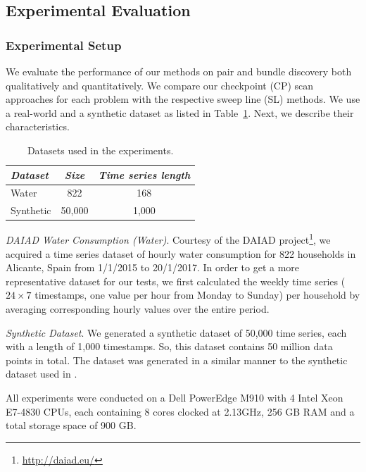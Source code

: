 \subsection{Experimental Evaluation}
\label{sec:eval}

\subsubsection{Experimental Setup}
\label{subsec:evaluation_setup}
We evaluate the performance of our methods on pair and bundle discovery both qualitatively and quantitatively. We compare our checkpoint (CP) scan approaches for each problem with the respective sweep line (SL) methods. We use a real-world and a synthetic dataset as listed in Table~\ref{tab:datasets}. Next, we describe their characteristics.

\begin{table}[t]
\centering
\caption{Datasets used in the experiments.}
 \vspace{-10pt}
\begin{small}
\begin{tabular}{lcc} 
\hline
{\em Dataset} & {\em Size} & {\em Time series length} \\
\hline
Water & 822 & 168  \\
Synthetic & 50,000 & 1,000 \\
\hline
\end{tabular}
\end{small}
\label{tab:datasets}
\end{table}

\emph{DAIAD Water Consumption (Water)}. Courtesy of the DAIAD project\footnote{ \url{http://daiad.eu/}}, we acquired a time series dataset of hourly water consumption for 822 households in Alicante, Spain from 1/1/2015 to 20/1/2017. In order to get a more representative dataset for our tests, we first calculated the weekly time series ($24 \times 7$ timestamps, one value per hour from Monday to Sunday) per household by averaging corresponding hourly values over the entire period.

\emph{Synthetic Dataset}. We generated a synthetic dataset of 50,000 time series, each with a length of 1,000 timestamps. So, this dataset contains 50 million data points in total. The dataset was generated in a similar manner to the synthetic dataset used in \cite{keogh1999indexing}.

All experiments were conducted on a Dell PowerEdge M910 with 4 Intel Xeon E7-4830 CPUs, each containing 8 cores clocked at 2.13GHz, 256 GB RAM and a total storage space of 900 GB.

